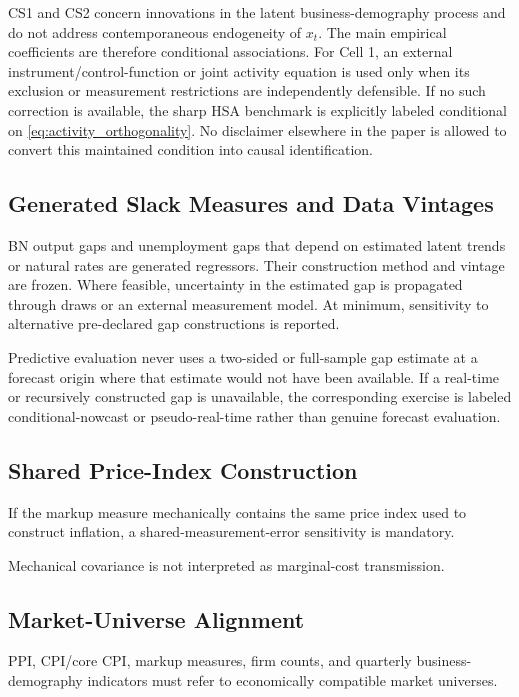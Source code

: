 \documentclass[11pt]{article}
\begin{document}
CS1 and CS2 concern innovations in the latent business-demography process and do not address contemporaneous endogeneity of $x_t$. The main empirical coefficients are therefore conditional associations. For Cell 1, an external instrument/control-function or joint activity equation is used only when its exclusion or measurement restrictions are independently defensible. If no such correction is available, the sharp HSA benchmark is explicitly labeled conditional on \cref{eq:activity_orthogonality}. No disclaimer elsewhere in the paper is allowed to convert this maintained condition into causal identification.

\subsection{Generated Slack Measures and Data Vintages}

BN output gaps and unemployment gaps that depend on estimated latent trends or natural rates are generated regressors. Their construction method and vintage are frozen. Where feasible, uncertainty in the estimated gap is propagated through draws or an external measurement model. At minimum, sensitivity to alternative pre-declared gap constructions is reported.

Predictive evaluation never uses a two-sided or full-sample gap estimate at a forecast origin where that estimate would not have been available. If a real-time or recursively constructed gap is unavailable, the corresponding exercise is labeled conditional-nowcast or pseudo-real-time rather than genuine forecast evaluation.

\subsection{Shared Price-Index Construction}

If the markup measure mechanically contains the same price index used to construct inflation, a shared-measurement-error sensitivity is mandatory.

Mechanical covariance is not interpreted as marginal-cost transmission.

\subsection{Market-Universe Alignment}

PPI, CPI/core CPI, markup measures, firm counts, and quarterly business-demography indicators must refer to economically compatible market universes.
\end{document}
